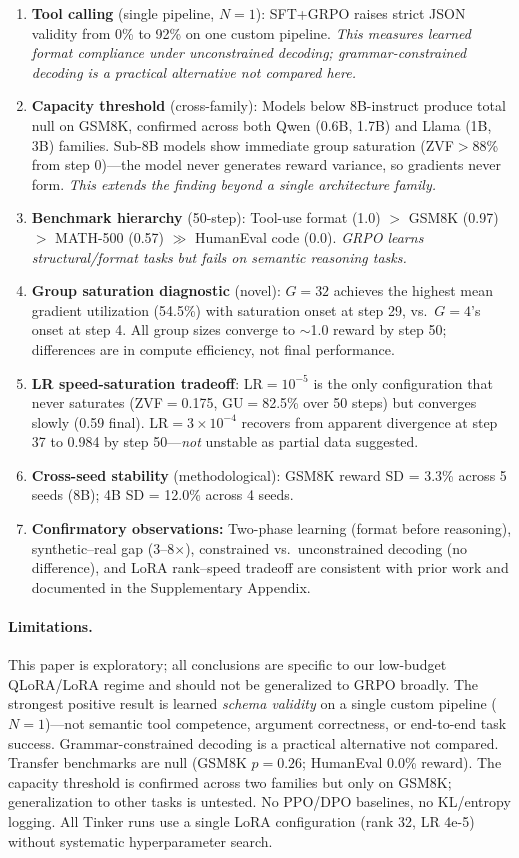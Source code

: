 \documentclass{article}
\begin{document}
\begin{enumerate}
    \item \textbf{Tool calling} (single pipeline, $N{=}1$): SFT+GRPO raises strict JSON validity from 0\% to 92\% on one custom pipeline. \emph{This measures learned format compliance under unconstrained decoding; grammar-constrained decoding is a practical alternative not compared here.}
    \item \textbf{Capacity threshold} (cross-family): Models below 8B-instruct produce total null on GSM8K, confirmed across both Qwen (0.6B, 1.7B) and Llama (1B, 3B) families. Sub-8B models show immediate group saturation (ZVF$>$88\% from step 0)---the model never generates reward variance, so gradients never form. \emph{This extends the finding beyond a single architecture family.}
    \item \textbf{Benchmark hierarchy} (50-step): Tool-use format (1.0) $>$ GSM8K (0.97) $>$ MATH-500 (0.57) $\gg$ HumanEval code (0.0). \emph{GRPO learns structural/format tasks but fails on semantic reasoning tasks.}
    \item \textbf{Group saturation diagnostic} (novel): $G{=}32$ achieves the highest mean gradient utilization (54.5\%) with saturation onset at step 29, vs.\ $G{=}4$'s onset at step 4. All group sizes converge to ${\sim}$1.0 reward by step 50; differences are in compute efficiency, not final performance.
    \item \textbf{LR speed-saturation tradeoff}: LR$=10^{-5}$ is the only configuration that never saturates (ZVF$=$0.175, GU$=$82.5\% over 50 steps) but converges slowly (0.59 final). LR$=3\times10^{-4}$ recovers from apparent divergence at step 37 to 0.984 by step 50---\emph{not} unstable as partial data suggested.
    \item \textbf{Cross-seed stability} (methodological): GSM8K reward SD = 3.3\% across 5 seeds (8B); 4B SD = 12.0\% across 4 seeds.
    \item \textbf{Confirmatory observations:} Two-phase learning (format before reasoning), synthetic--real gap (3--8$\times$), constrained vs.\ unconstrained decoding (no difference), and LoRA rank--speed tradeoff are consistent with prior work and documented in the Supplementary Appendix.
\end{enumerate}

\paragraph{Limitations.} This paper is exploratory; all conclusions are specific to our low-budget QLoRA/LoRA regime and should not be generalized to GRPO broadly. The strongest positive result is learned \emph{schema validity} on a single custom pipeline ($N{=}1$)---not semantic tool competence, argument correctness, or end-to-end task success. Grammar-constrained decoding is a practical alternative not compared. Transfer benchmarks are null (GSM8K $p{=}0.26$; HumanEval 0.0\% reward). The capacity threshold is confirmed across two families but only on GSM8K; generalization to other tasks is untested. No PPO/DPO baselines, no KL/entropy logging. All Tinker runs use a single LoRA configuration (rank 32, LR 4e-5) without systematic hyperparameter search.
\end{document}
